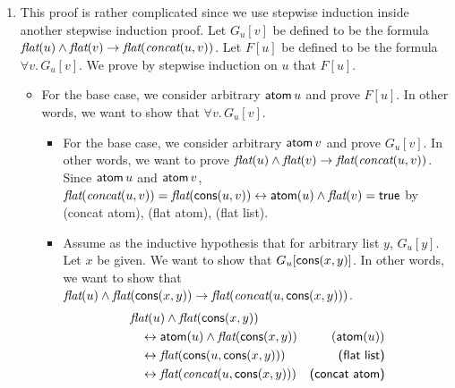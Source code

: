 \begin{exer}[4.1]
    $ $
    \begin{enumerate}[label=(\alph*)]
        \item
            This proof is rather complicated since we use stepwise induction inside another stepwise induction proof.
            Let $G_u[v]$ be defined to be the formula $\operatorname{\textit{flat}}(u) \land \operatorname{\textit{flat}}(v) \rightarrow \operatorname{\textit{flat}}(\operatorname{\textit{concat}}(u, v))$.
            Let $F[u]$ be defined to be the formula $\forall v.\, G_u[v]$.
            We prove by stepwise induction on $u$ that $F[u]$.

            \begin{itemize}
                \item
                    For the base case, we consider arbitrary $\operatorname{\textsf{atom}} u$ and prove $F[u]$.
                    In other words, we want to show that $\forall v.\, G_u[v]$.
                    \begin{itemize}
                        \item
                            For the base case, we consider arbitrary $\operatorname{\textsf{atom}} v$ and prove $G_u[v]$.
                            In other words, we want to prove $\operatorname{\textit{flat}}(u) \land \operatorname{\textit{flat}}(v) \rightarrow \operatorname{\textit{flat}}(\operatorname{\textit{concat}}(u, v))$.
                            Since $\operatorname{\textsf{atom}} u$ and $\operatorname{\textsf{atom}} v$, $\operatorname{\textit{flat}}(\operatorname{\textit{concat}}(u, v)) = \operatorname{\textit{flat}}(\operatorname{\textsf{cons}}(u, v)) \leftrightarrow \operatorname{\textsf{atom}}(u) \land \operatorname{\textit{flat}}(v) = \operatorname{\textsf{true}}$ by \textsf{(concat atom)}, \textsf{(flat atom)}, \textsf{(flat list)}.
                        \item
                            Assume as the inductive hypothesis that for arbitrary list $y$, $G_u[y]$.
                            Let $x$ be given.
                            We want to show that $G_u[\operatorname{\textsf{cons}}(x, y)]$.
                            In other words, we want to show that $\operatorname{\textit{flat}}(u) \land \operatorname{\textit{flat}}(\operatorname{\textsf{cons}}(x, y)) \rightarrow \operatorname{\textit{flat}}(\operatorname{\textit{concat}}(u, \operatorname{\textsf{cons}}(x, y)))$.
                            \begin{align*}
                                &\flatlist(u) \land \flatlist(\cons(x, y)) \\
                                &\quad\leftrightarrow \atom(u) \land \flatlist(\cons(x, y)) & (\atom(u)) \\
                                &\quad\leftrightarrow \flatlist(\cons(u, \cons(x, y))) & \textsf{(flat list)} \\
                                &\quad\leftrightarrow \flatlist(\concat(u, \cons(x, y))) & \textsf{(concat atom)} \\

\end{align*}
\end{itemize}
\end{itemize}
\end{enumerate}
\end{exer}
